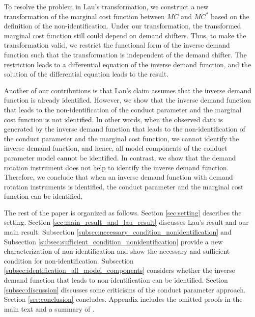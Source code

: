 \documentclass[11pt, a4paper]{article}
\begin{document}
To resolve the problem in Lau's transformation, we construct a new transformation of the marginal cost function between $MC$ and $MC^{*}$ based on the definition of the non-identification.
Under our transformation, the transformed marginal cost function still could depend on demand shifters.
Thus, to make the transformation valid, we restrict the functional form of the inverse demand function such that the transformation is independent of the demand shifter.
The restriction leads to a differential equation of the inverse demand function, and the solution of the differential equation leads to the result.

Another of our contributions is that Lau's claim assumes that the inverse demand function is already identified.
However, we show that the inverse demand function that leads to the non-identification of the conduct parameter and the marginal cost function is not identified.
In other words, when the observed data is generated by the inverse demand function that leads to the non-identification of the conduct parameter and the marginal cost function, we cannot identify the inverse demand function, and hence, all model components of the conduct parameter model cannot be identified.
In contrast, we show that the demand rotation instrument does not help to identify the inverse demand function. 
Therefore, we conclude that when an inverse demand function with demand rotation instruments is identified, the conduct parameter and the marginal cost function can be identified.

The rest of the paper is organized as follows.
Section \ref{sec:setting} describes the setting.
Section \ref{sec:main_result_and_lau_result} discusses Lau's result and our main result.
Subsection \ref{subsec:necessary_condition_nonidentification} and Subsection \ref{subsec:sufficient_condition_nonidentification} provide a new characterization of non-identification and show the necessary and sufficient condition for non-identification.
Subsection \ref{subsec:identification_all_model_components} considers whether the inverse demand function that leads to non-identification can be identified.
Section \ref{subsec:discussion} discusses some criticisms of the conduct parameter approach.
Section \ref{sec:conclusion} concludes.
Appendix includes the omitted proofs in the main text and a summary of \citet{goldmanNote1964}.


\end{document}
